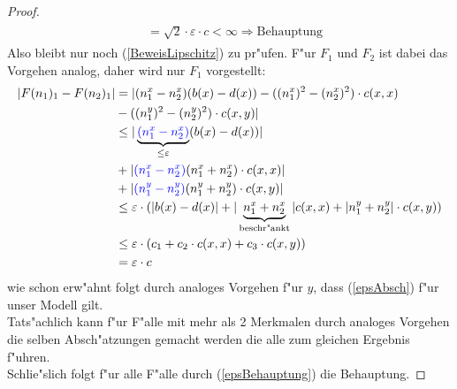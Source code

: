 \documentclass[11pt, a4paper, german]{article}
\theoremstyle{plain}
\newcommand{\eps}{\ensuremath{\varepsilon}}
\begin{document}
\begin{proof}
\begin{align}
\begin{split}
				&= \sqrt{2} \cdot \eps \cdot c < \infty \Rightarrow \text{Behauptung}
				\label{epsBehauptung}
			\end{split}
			\end{align}
			Also bleibt nur noch (\ref{BeweisLipschitz}) zu pr"ufen. F"ur $ F_1 $ und $ F_2 $ ist dabei das Vorgehen analog, daher wird nur $ F_1 $ vorgestellt:\\
			\begin{align*}
				|F(n_1)_1 - F(n_2)_1| & = |(n_1^x - n_2^x)(b(x) - d(x)) - ((n_1^x)^2 - (n_2^x)^2) \cdot c(x,x)\\
				&  - ((n_1^y)^2 - (n_2^y)^2) \cdot c(x,y) |\\
				& \le  |\underbrace{\textcolor{blue}{(n_1^x - n_2^x)}}_{ \le \eps}(b(x) - d(x)) |\\
				& + | \textcolor{blue}{(n_1^x - n_2^x)}(n_1^x + n_2^x) \cdot c(x,x) | \\
				& + | \textcolor{blue}{(n_1^y - n_2^y)}(n_1^y + n_2^y) \cdot c(x,y) |\\
				& \le \eps \cdot (| b(x) - d(x) | +  |\underbrace{n_1^x + n_2^x}_{\text{beschr"ankt}}| c(x,x) + | n_1^y + n_2^y | \cdot c(x,y))\\
				& \le \eps \cdot ( c_1 + c_2 \cdot c(x,x) + c_3 \cdot c(x,y) )\\
				& = \eps \cdot c
			\end{align*}
			wie schon erw"ahnt folgt durch analoges Vorgehen f"ur $ y $, dass (\ref{epsAbsch}) f"ur unser Modell gilt.\\ 
			Tats"achlich kann f"ur F"alle mit mehr als 2 Merkmalen durch analoges Vorgehen die selben Absch"atzungen gemacht werden die alle zum gleichen Ergebnis f"uhren.\\
			Schlie"slich folgt f"ur alle F"alle durch (\ref{epsBehauptung}) die Behauptung.
		\end{proof}
	
\end{document}
